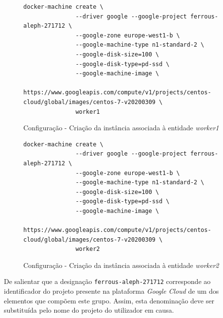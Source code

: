 \documentclass[a4paper]{report}
\begin{document}
{\begin{enumerate}[label=\textbf{\arabic*.}]
            \begin{figure}[H]
                \centering
                \begin{verbatim}
docker-machine create \
               --driver google --google-project ferrous-aleph-271712 \
               --google-zone europe-west1-b \
               --google-machine-type n1-standard-2 \
               --google-disk-size=100 \
               --google-disk-type=pd-ssd \
               --google-machine-image \
               https://www.googleapis.com/compute/v1/projects/centos-cloud/global/images/centos-7-v20200309 \
               worker1
                \end{verbatim}
                \caption{Configuração - Criação da instância associada à entidade \textsl{worker1}}
                \label{fig:2}
            \end{figure}

            \begin{figure}[H]
                \centering
                \begin{verbatim}
docker-machine create \
               --driver google --google-project ferrous-aleph-271712 \
               --google-zone europe-west1-b \
               --google-machine-type n1-standard-2 \
               --google-disk-size=100 \
               --google-disk-type=pd-ssd \
               --google-machine-image \
               https://www.googleapis.com/compute/v1/projects/centos-cloud/global/images/centos-7-v20200309 \
               worker2
                \end{verbatim}
                \caption{Configuração - Criação da instância associada à entidade \textsl{worker2}}
                \label{fig:3}
            \end{figure}

            De salientar que a designação \texttt{ferrous-aleph-271712} corresponde ao identificador do projeto presente na plataforma \textit{Google Cloud} de um dos elementos que compõem este grupo.
            Assim, esta denominação deve ser substituída pelo nome do projeto do utilizador em causa.


\end{enumerate}}
\end{document}
